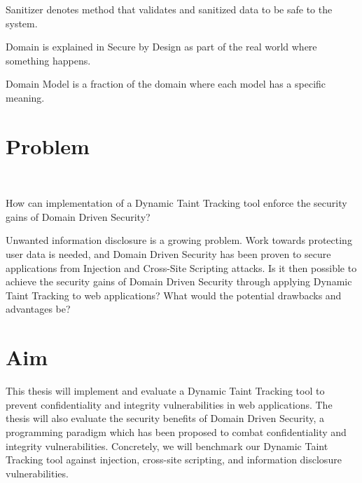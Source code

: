 \begin{definition}{Sanitizer}
    denotes method that validates and sanitized data to be safe to the system.
    \\
\end{definition}

\begin{definition}{Domain}
    is explained in Secure by Design \parencite{sbd2018} as part of the real world where something happens.
    \\
\end{definition}

\begin{definition}{Domain Model}
    is a fraction of the domain where each model has a specific meaning.
    \\
\end{definition}


\section{Problem}
\label{Problem}
\hfill \\
\begin{chapquote}{}
    How can implementation of a Dynamic Taint Tracking tool enforce the security gains of Domain Driven Security?
\end{chapquote}

\noindent
Unwanted information disclosure is a growing problem. Work towards protecting user data is needed, and Domain Driven Security has been proven to secure applications from Injection and Cross-Site Scripting attacks. Is it then possible to achieve the security gains of Domain Driven Security through applying Dynamic Taint Tracking to web applications? What would the potential drawbacks and advantages be?


\section{Aim}
\label{Aim}
This thesis will implement and evaluate a Dynamic Taint Tracking tool to prevent confidentiality and integrity vulnerabilities in web applications. The thesis will also evaluate the security benefits of Domain Driven Security, a programming paradigm which has been proposed to combat confidentiality and integrity vulnerabilities. Concretely, we will benchmark our Dynamic Taint Tracking tool against injection, cross-site scripting, and information disclosure vulnerabilities.


